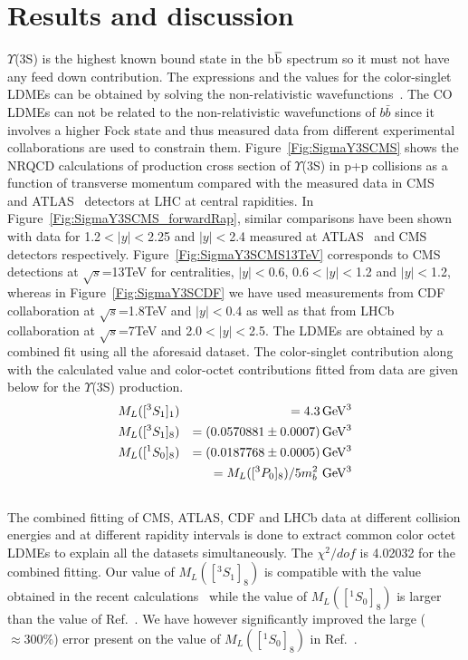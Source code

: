 \documentclass[twocolumn,amsmath,amssymb]{snp}
\begin{document}
\section*{Results and discussion}
$\Upsilon$(3S) is the highest known bound state in the b$\overline{\rm b}$ spectrum 
so it must not have any feed down contribution. 
The expressions and the values for the 
color-singlet LDMEs can be obtained by solving the non-relativistic 
wavefunctions~\cite{Cho:1995vh}. 
The CO LDMEs can not be related to the non-relativistic
wavefunctions of $b \bar b$ since it involves a higher Fock state and thus
measured data from different experimental collaborations are used to constrain them.
Figure~\ref{Fig:SigmaY3SCMS} shows the NRQCD calculations of production cross section of 
$\Upsilon$(3S) in p+p collisions as a function of transverse momentum compared with the 
measured data in CMS~\cite{Khachatryan:2015qpa} and ATLAS~\cite{Khachatryan:2015qpa} 
detectors at LHC at central rapidities. In Figure~\ref{Fig:SigmaY3SCMS_forwardRap},
similar comparisons have been shown with data for 1.2$<|y|<$2.25 and $|y|<$2.4
measured at ATLAS~\cite{Aad:2012dlq} and CMS~\cite{CMS_Rapl24} detectors 
respectively. Figure~\ref{Fig:SigmaY3SCMS13TeV} corresponds to CMS ~\cite{CMS13TeV}
detections at $\sqrt{s}$=13TeV for centralities, $|y|<$0.6, 0.6$<|y|<$1.2 and $|y|<$1.2, whereas in 
Figure~\ref{Fig:SigmaY3SCDF} we have used measurements from CDF~\cite{CDF_Acosta}
collaboration at $\sqrt{s}$=1.8TeV and $|y|<$0.4 as well as that from LHCb ~\cite{LHCb_Aaij}
collaboration at $\sqrt{s}$=7TeV and 2.0$<|y|<$2.5.
The LDMEs are obtained by a combined fit using all the aforesaid dataset.
The color-singlet contribution along with the calculated value 
and color-octet contributions fitted from data are given below for the 
$\Upsilon$(3S) production.
\begin{eqnarray}
  &M_{L}([^3S_1]_{1}) &= 4.3 \,{\rm GeV^3}\nonumber \\
  &M_{L}([^3S_1]_{8}) &= (0.0570881\pm0.0007) \, {\rm GeV^3}\nonumber \\
  &M_{L}([^1S_0]_{8}) &= (0.0187768\pm0.0005) \,{\rm GeV^3} \nonumber \\ \nonumber
  &&=  M_{L}([^3P_0]_{8})/5m_{b}^{2}\,\,{\rm GeV^3} \nonumber \\ \nonumber
\end{eqnarray}
The combined fitting of CMS, ATLAS, CDF and LHCb data at different collision
energies and at different rapidity intervals is done to extract common color octet LDMEs 
to explain all the datasets simultaneously. The $\chi^2/dof$ is 4.02032 for the 
combined fitting. Our value of $M_{L}([^3S_1]_{8})$ is compatible with the value obtained in the recent 
calculations~\cite{Sharma:2012dy} while the value of $M_{L}([^1S_0]_{8})$ is larger than
the value of Ref.~\cite{Sharma:2012dy}. We have however significantly improved the large ($\approx 300\%$) error 
present on the value of $M_{L}([^1S_0]_{8})$ in Ref.~\cite{Sharma:2012dy}.
\end{document}
